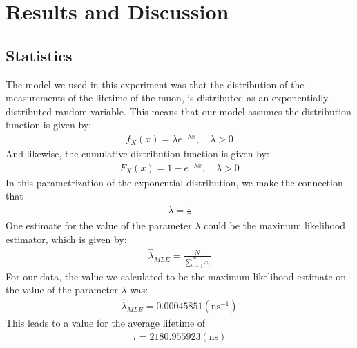 \section*{Results and Discussion}
\subsection*{Statistics}
The model we used in this experiment was that the distribution of the measurements of the lifetime of the muon, is distributed as an exponentially distributed random variable. This means that our model assumes the distribution function is given by:
\begin{align}
        f_{X}(x)=\lambda e^{-\lambda x}, \quad \lambda > 0
\end{align}
And likewise, the cumulative distribution function is given by:
\begin{align}
        F_{X}(x)=1-e^{-\lambda x}, \quad \lambda > 0
\end{align}
In this parametrization of the exponential distribution, we make the connection that 
\begin{align}
        \lambda = \frac{1}{\tau}
\end{align}
One estimate for the value of the parameter $\lambda$ could be the maximum likelihood estimator, which is given by:
\begin{align}
        \hat{\lambda}_{MLE}=\frac{N}{\sum_{i=1}^Nx_i}
\end{align}
For our data, the value we calculated to be the maximum likelihood estimate on the value of the parameter $\lambda$ was:
\begin{align}
        \hat{\lambda}_{MLE}=0.00045851(\textrm{ns}^{-1})
\end{align}
This leads to a value for the average lifetime of 
\begin{align}
        \tau=2180.955923(\textrm{ns})
\end{align}
